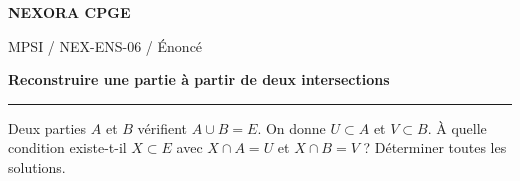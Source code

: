 \documentclass[11pt,a4paper]{article}
\begin{document}
{\small\bfseries\color{nexorablue} NEXORA CPGE}\par
{\small MPSI / NEX-ENS-06 / Énoncé}\par
{\LARGE\bfseries Reconstruire une partie à partir de deux intersections}\par
\vspace{0.25em}\hrule\vspace{0.6em}

Deux parties $A$ et $B$ vérifient $A\cup B=E$. On donne $U\subset A$ et $V\subset B$. À quelle condition existe-t-il $X\subset E$ avec $X\cap A=U$ et $X\cap B=V$ ? Déterminer toutes les solutions.
\end{document}
